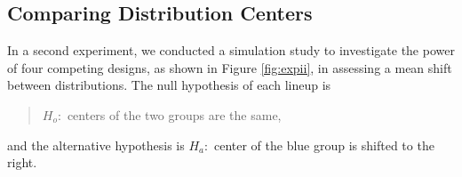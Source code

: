 
\subsection{Comparing Distribution Centers}

In a second experiment, we conducted a simulation study to investigate the power of four competing designs, as shown in Figure \ref{fig:expii}, in assessing a mean shift between distributions. The null hypothesis of each lineup is 

\vspace{-0.1in}
\begin{quote}
$H_o:$ centers of the two groups are the same,
\end{quote}
\vspace{-0.1in}

\noindent and the alternative hypothesis is $H_a:$ center of the blue group is shifted to the right.

